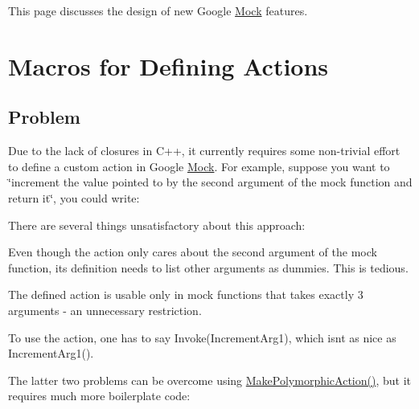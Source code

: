 This page discusses the design of new Google \mbox{\hyperlink{class_mock}{Mock}} features.

\section*{Macros for Defining Actions}

\subsection*{Problem}

Due to the lack of closures in C++, it currently requires some non-\/trivial effort to define a custom action in Google \mbox{\hyperlink{class_mock}{Mock}}. For example, suppose you want to \char`\"{}increment the value pointed to by the
second argument of the mock function and return it\char`\"{}, you could write\+:


\begin{DoxyCode}{0}
\DoxyCodeLine{\}}
\DoxyCodeLine{}
\end{DoxyCode}


There are several things unsatisfactory about this approach\+:


\begin{DoxyItemize}
\item Even though the action only cares about the second argument of the mock function, its definition needs to list other arguments as dummies. This is tedious.
\item The defined action is usable only in mock functions that takes exactly 3 arguments -\/ an unnecessary restriction.
\item To use the action, one has to say {\ttfamily Invoke(\+Increment\+Arg1)}, which isn\textquotesingle{}t as nice as {\ttfamily Increment\+Arg1()}.
\end{DoxyItemize}

The latter two problems can be overcome using {\ttfamily \mbox{\hyperlink{namespacetesting_a45df529b8166936d970884383f0ede82}{Make\+Polymorphic\+Action()}}}, but it requires much more boilerplate code\+:


